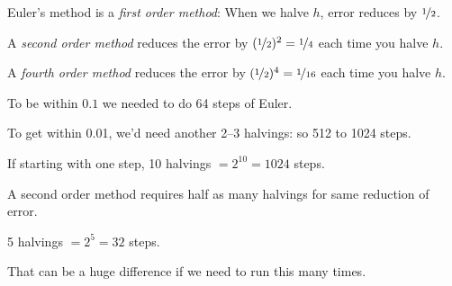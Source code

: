 \documentclass[10pt,aspectratio=169]{beamer}
\begin{document}
\begin{frame}

Euler's method is a \emph{first order method}:
When we halve $h$, error reduces by $\nicefrac{1}{2}$.

\medskip
\pause

A \emph{second order method} reduces the error by
$(\nicefrac{1}{2})^2 = \nicefrac{1}{4}$ each time you halve $h$.

\medskip
\pause

A \emph{fourth order method} reduces the error by
$(\nicefrac{1}{2})^4 = \nicefrac{1}{16}$ each time you halve $h$.

\medskip
\pause

To be within $0.1$ we needed to do 64 steps of Euler.

\medskip
\pause

To get within 0.01, we'd need another 2--3 halvings: so 512 to 1024 steps.

\medskip
\pause

If starting with one step, 10 halvings ${} = 2^{10} = 1024$ steps.

\medskip
\pause

A second order method requires half as many halvings for same
reduction of error.

\medskip
\pause

5 halvings ${} = 2^{5} = 32$ steps.

\medskip
\pause

That can be a huge difference if we need to run this many times.
\end{frame}
\end{document}
